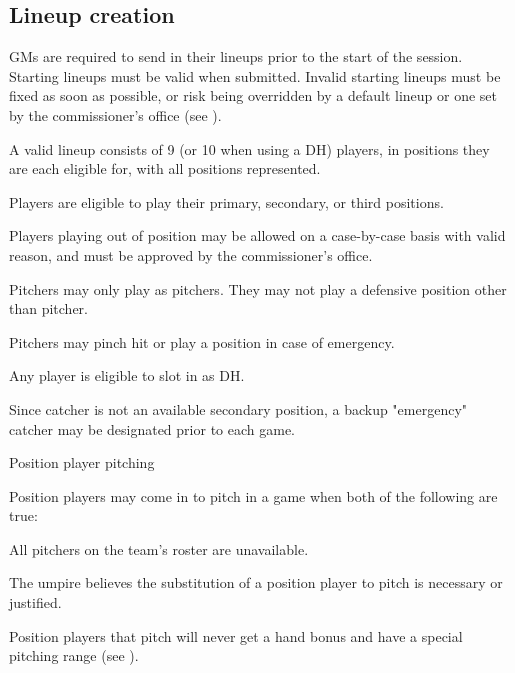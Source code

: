 \subsection{Lineup creation}
\label{sec:lineups}
\begin{deepEnumerate}
	\item GMs are required to send in their lineups prior to the start of the session. Starting lineups must be valid when submitted.
	Invalid starting lineups must be fixed as soon as possible, or risk being overridden by a default lineup 
	or one set by the commissioner's office (see ). 
	\begin{deepEnumerate}
		\item A valid lineup consists of 9 (or 10 when using a DH) players,	in positions they are each eligible for, with all positions represented.
		\begin{deepEnumerate}
			\item Players are eligible to play their primary, secondary, or third positions.
			\item Players playing out of position may be allowed on a case-by-case basis with valid reason,	and must be approved by the commissioner's office.
		\end{deepEnumerate}
		\item Pitchers may only play as pitchers. They may not play a defensive position other than pitcher.
		\begin{deepEnumerate}
			\item Pitchers may pinch hit or play a position in case of emergency.
		\end{deepEnumerate}
		\item Any player is eligible to slot in as DH.
		\item Since catcher is not an available secondary position,	a backup "emergency" catcher may be designated prior to each game.
		\item Position player pitching
		\begin{deepEnumerate}
			\item Position players may come in to pitch in a game when both of the following are true:
			\begin{deepEnumerate}
				\item All pitchers on the team's roster are unavailable.
				\item The umpire believes the substitution of a position player to pitch is necessary or justified.
			\end{deepEnumerate}
			\item Position players that pitch will never get a hand bonus and have a special pitching range (see ).

\end{deepEnumerate}
\end{deepEnumerate}
\end{deepEnumerate}
